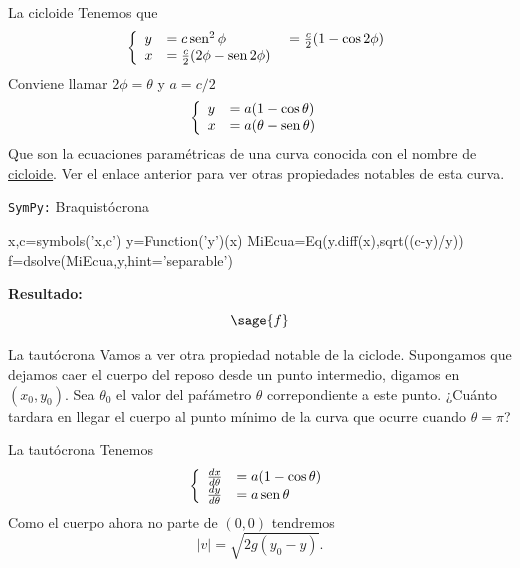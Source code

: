 \documentclass[handout,hyperref={colorlinks=true}]{beamer}
\DeclareMathOperator{\sen}{sen}
\newcommand{\nl}{\onslide<+-> }
\begin{document}
  \begin{frame}{La cicloide}
 Tenemos que
 \[\left\{\begin{array}{l l l}
	      y&=c\sen^2 \phi&=\frac{c}{2}(1-\cos2\phi)\\
	      x&=\frac{c}{2}(2\phi-\sen2\phi)\ &\\
          \end{array}\right.
\]
Conviene llamar $2\phi=\theta$ y $a=c/2$
 \[\left\{\begin{array}{l l }
	      y&= a(1-\cos\theta)\\
	      x&=a(\theta-\sen\theta)\
          \end{array}\right.
\]
Que son la ecuaciones paramétricas de una curva conocida con el nombre de \href{http://es.wikipedia.org/wiki/Cicloide}{cicloide}. Ver el enlace anterior para ver 
otras propiedades notables de esta curva.
\begin{center}
\end{center}
  
  \end{frame}

\begin{frame}[fragile]{\texttt{SymPy:} Braquistócrona}
\begin{sageblock}
x,c=symbols('x,c')
y=Function('y')(x)
MiEcua=Eq(y.diff(x),sqrt((c-y)/y))
f=dsolve(MiEcua,y,hint='separable')
\end{sageblock}


\textbf{Resultado:}
\begingroup
\everymath{\scriptstyle}
\scriptsize
\[\sage{f}\]
\endgroup
\end{frame}



  \begin{frame}{La tautócrona}
  Vamos a ver otra propiedad notable de la ciclode. Supongamos que dejamos caer el cuerpo del reposo desde un punto intermedio, digamos en $(x_0,y_0)$. Sea  $\theta_0$
 el valor del paŕámetro $\theta$ correpondiente a este punto. ¿Cuánto tardara en llegar el cuerpo al punto mínimo de la curva que ocurre cuando $\theta=\pi$? 
\begin{center}
\end{center}

  \end{frame}
  
  
  \begin{frame}{La tautócrona}
\nl Tenemos
\[
 \left\{ \begin{array}{l l}
 \frac{dx}{d\theta}&=a(1-\cos\theta)\\
 \frac{dy}{d\theta}&=a\sen\theta 
 \end{array}\right.
\]
% 
Como el cuerpo ahora no parte de $(0,0)$ tendremos
\[|v|=\sqrt{2g(y_0-y)}.\]

  \end{frame}
  
\end{document}

